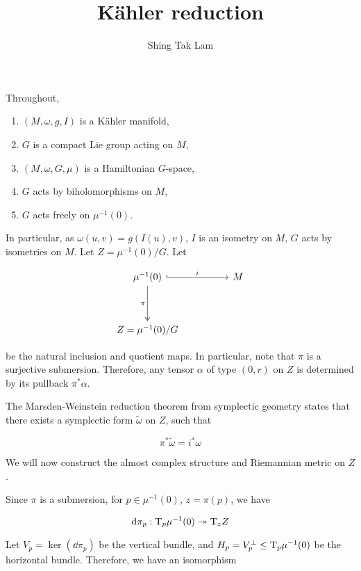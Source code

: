 \documentclass{article}
\title{K\"ahler reduction}
\author{Shing Tak Lam}
\renewcommand{\tilde}{\widetilde}
\newcommand{\surj}{\twoheadrightarrow}
\begin{document}
\maketitle

Throughout,

\begin{enumerate}
    \item \((M, \omega, g, I)\) is a K\"ahler manifold,
    \item \(G\) is a compact Lie group acting on \(M\),
    \item \((M, \omega, G, \mu)\) is a Hamiltonian \(G\)-space,
    \item \(G\) acts by biholomorphisms on \(M\),
    \item \(G\) acts freely on \(\mu^{-1}(0)\).
\end{enumerate}

In particular, as \(\omega(u, v) = g(I(u), v)\), \(I\) is an isometry on \(M\), \(G\) acts by isometries on \(M\). Let \(Z = \mu^{-1}(0)/G\). Let

\[\begin{tikzcd}
	{\mu^{-1}(0)} && M \\
	\\
	{Z=\mu^{-1}(0)/G}
	\arrow["i", hook, from=1-1, to=1-3]
	\arrow["\pi"', two heads, from=1-1, to=3-1]
\end{tikzcd}\]

be the natural inclusion and quotient maps. In particular, note that \(\pi\) is a surjective submersion. Therefore, any tensor \(\alpha\) of type \((0, r)\) on \(Z\) is determined by its pullback \(\pi^*\alpha\).

The Marsden-Weinstein reduction theorem from symplectic geometry states that there exists a symplectic form \(\tilde\omega\) on \(Z\), such that

\[\pi^*\tilde\omega = i^*\omega\]

We will now construct the almost complex structure and Riemannian metric on \(Z\).

Since \(\pi\) is a submersion, for \(p \in \mu^{-1}(0)\), \(z = \pi(p)\), we have

\[\dd\pi_p : \TT_p\mu^{-1}(0) \surj \TT_zZ\]

Let \(V_p = \ker(\dd\pi_p)\) be the vertical bundle, and \(H_p = V_p^\perp \le \mathrm{T}_p\mu^{-1}(0)\) be the horizontal bundle. Therefore, we have an isomorphism
\end{document}
